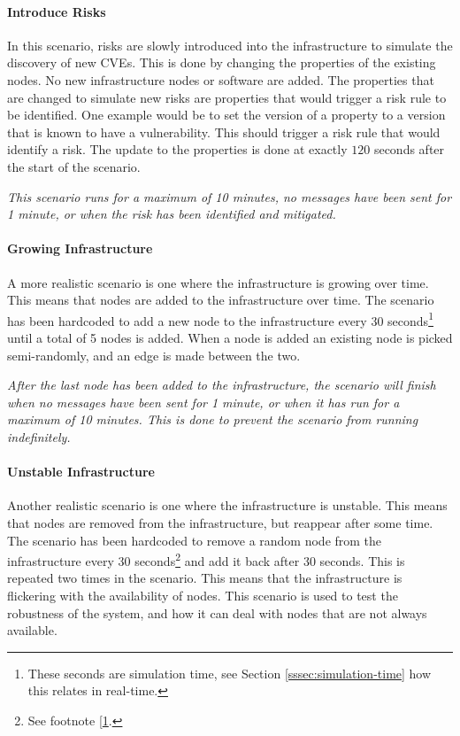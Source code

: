 \paragraph{Introduce Risks} 
In this scenario, risks are slowly introduced into the infrastructure to simulate the discovery of new CVEs. This is done by changing the properties of the existing nodes. No new infrastructure nodes or software are added. The properties that are changed to simulate new risks are properties that would trigger a risk rule to be identified. One example would be to set the  version of a property to a version that is known to have a vulnerability. This should trigger a risk rule that would identify a risk.
The update to the properties is done at exactly $120$ seconds after the start of the scenario. 

\textit{This scenario runs for a maximum of 10 minutes, no messages have been sent for 1 minute, or when the risk has been identified and mitigated.}

\paragraph*{Growing Infrastructure}
A more realistic scenario is one where the infrastructure is growing over time. This means that nodes are added to the infrastructure over time. The scenario has been hardcoded to add a new node to the infrastructure every 30 seconds\footnote{\label{footnote:simulation-time}These seconds are simulation time, see Section \ref{sssec:simulation-time} how this relates in real-time.} until a total of 5 nodes is added. When a node is added an existing node is picked semi-randomly, and an edge is made between the two.

\textit{After the last node has been added to the infrastructure, the scenario will finish when no messages have been sent for 1 minute, or when it has run for a maximum of 10 minutes. This is done to prevent the scenario from running indefinitely.}

\paragraph*{Unstable Infrastructure}
Another realistic scenario is one where the infrastructure is unstable. This means that nodes are removed from the infrastructure, but reappear after some time. The scenario has been hardcoded to remove a random node from the infrastructure every 30 seconds\footnote{See footnote [\ref{footnote:simulation-time}.} and add it back after 30 seconds. This is repeated two times in the scenario. This means that the infrastructure is flickering with the availability of nodes. This scenario is used to test the robustness of the system, and how it can deal with nodes that are not always available.

